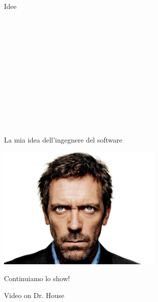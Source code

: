\documentclass{beamer}
\begin{document}
\begin{frame}{\centerline{Idee}}
\noindent\makebox[\linewidth]{\rule{\paperwidth}{0.4pt}}\\
\vspace{0.5cm}

\noindent\makebox[\linewidth]{\rule{\paperwidth}{0.4pt}}\\
\vspace{0.5cm}

\noindent\makebox[\linewidth]{\rule{\paperwidth}{0.4pt}}\\
\vspace{0.5cm}

\noindent\makebox[\linewidth]{\rule{\paperwidth}{0.4pt}}\\
\vspace{0.5cm}

\noindent\makebox[\linewidth]{\rule{\paperwidth}{0.4pt}}\\
\vspace{0.5cm}

\noindent\makebox[\linewidth]{\rule{\paperwidth}{0.4pt}}\\
\vspace{0.5cm}

\noindent\makebox[\linewidth]{\rule{\paperwidth}{0.4pt}}\\

\end{frame}

\begin{frame}{\centerline{La mia idea dell'ingegnere del software}}

\begin{center}
\includegraphics[width=80mm]{P2023.AIBCCSS.IlConcettoDiSoftware/DrHouse_SoftwareEngineer.jpg}
\end{center}

\end{frame}

\begin{frame}{\centerline{Continuiamo lo show!}}
\vspace*{1.5cm}
\begin{center}
\Huge Video on Dr. House

\end{center}

\end{frame}
\end{document}

